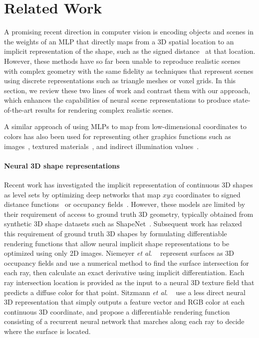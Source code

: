 \documentclass[runningheads]{llncs}
\newcommand{\etal}{\textit{et al}. }
\newcommand{\posxyz}{xyz}
\begin{document}
\section{Related Work}

A promising recent direction in computer vision is encoding objects and scenes in the weights of an MLP that directly maps from a 3D spatial location to an implicit representation of the shape, such as the signed distance~\cite{sdf} at that location. However, these methods have so far been unable to reproduce realistic scenes with complex geometry with the same fidelity as techniques that represent scenes using discrete representations such as triangle meshes or voxel grids. In this section, we review these two lines of work and contrast them with our approach, which enhances the capabilities of neural scene representations to produce state-of-the-art results for rendering complex realistic scenes. 

A similar approach of using MLPs to map from low-dimensional coordinates to colors has also been used for representing other graphics functions such as images~\cite{stanley2007compositional}, textured materials~\cite{henzler20,texturefields,rainer20,rainer19}, and indirect illumination values~\cite{rrf}.

\paragraph{\textbf{Neural 3D shape representations}}

Recent work has investigated the implicit representation of continuous 3D shapes as level sets by optimizing deep networks that map $\posxyz$ coordinates to signed distance functions~\cite{jiang2020,deepsdf} or occupancy fields~\cite{genova2020,occupancynet}. However, these models are limited by their requirement of access to ground truth 3D geometry, typically obtained from synthetic 3D shape datasets such as ShapeNet~\cite{shapenet}. 
Subsequent work has relaxed this requirement of ground truth 3D shapes by formulating differentiable rendering functions that allow neural implicit shape representations to be optimized using only 2D images. Niemeyer \etal~\cite{diffvolumetric} represent surfaces as 3D occupancy fields and use a numerical method to find the surface intersection for each ray, then calculate an exact derivative using implicit differentiation. Each ray intersection location is provided as the input to a neural 3D texture field that predicts a diffuse color for that point. Sitzmann \etal~\cite{srn} use a less direct neural 3D representation that simply outputs a feature vector and RGB color at each continuous 3D coordinate, and propose a differentiable rendering function consisting of a recurrent neural network that marches along each ray to decide where the surface is located.
\end{document}
